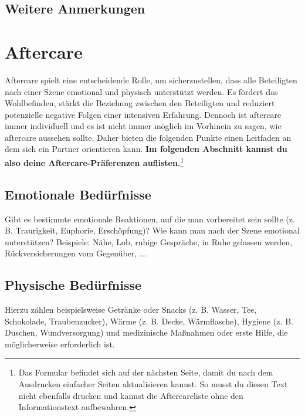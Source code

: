 \documentclass[a4paper,12pt]{article}
\begin{document}
\subsection{Weitere Anmerkungen}
\noindent \TextField[name=WahrAnmMisc,multiline=true,height=20em, width=37em]{}


\newpage
\section{Aftercare}
Aftercare spielt eine entscheidende Rolle, um sicherzustellen, dass alle Beteiligten nach einer Szene emotional und physisch unterstützt werden. Es fördert das Wohlbefinden, stärkt die Beziehung zwischen den Beteiligten und reduziert potenzielle negative Folgen einer intensiven Erfahrung. Dennoch ist aftercare immer individuell und es ist nicht immer möglich im Vorhinein zu sagen, wie aftercare aussehen sollte. Daher bieten die folgenden Punkte einen Leitfaden an dem sich ein Partner orientieren kann.
\textbf{Im folgenden Abschnitt kannst du also deine Aftercare-Präferenzen auflisten.}\footnote{Das Formular befindet sich auf der nächsten Seite, damit du nach dem Ausdrucken einfacher Seiten aktualisieren kannst. So musst du diesen Text nicht ebenfalls drucken und kannst die Aftercareliste ohne den Informationstext aufbewahren.}
\newpage

\subsection{Emotionale Bedürfnisse}
\noindent Gibt es bestimmte emotionale Reaktionen, auf die man vorbereitet sein sollte (z. B. Traurigkeit, Euphorie, Erschöpfung)? Wie kann man nach der Szene emotional unterstützen? Beispiele: Nähe, Lob, ruhige Gespräche, in Ruhe gelassen werden, Rückversicherungen vom Gegenüber, ... \newline
\noindent \TextField[name=AftercareEmotional,multiline=true,height=7em, width=37em]{}

\subsection{Physische Bedürfnisse}
\noindent Hierzu zählen beispielsweise Getränke oder Snacks (z. B. Wasser, Tee, Schokolade, Traubenzucker), Wärme (z. B. Decke, Wärmflasche), Hygiene (z. B. Duschen, Wundversorgung) und medizinische Maßnahmen oder erste Hilfe, die möglicherweise erforderlich ist. \newline
\noindent \TextField[name=AftercarePhysisch,multiline=true,height=7em, width=37em]{}
\end{document}
